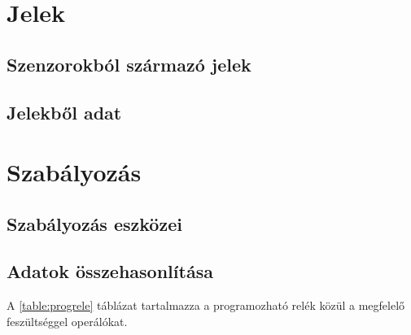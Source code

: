 \section{Jelek}

\subsection{Szenzorokból származó jelek}

\subsection{Jelekből adat}


\section{Szabályozás}

\subsection{Szabályozás eszközei}

\subsection{Adatok összehasonlítása}

A \ref{table:progrele} táblázat tartalmazza a programozható relék közül a megfelelő feszültséggel operálókat.

